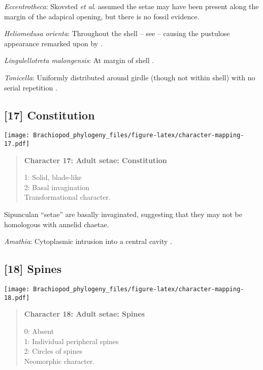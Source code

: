 \documentclass[openany]{book}
\theoremstyle{definition}
\theoremstyle{definition}
\theoremstyle{definition}
\theoremstyle{remark}
\begin{document}
\hypertarget{Eccentrotheca-coding-16}{}
\emph{Eccentrotheca}: Skovsted \emph{et al}.
\citeyearpar{Skovsted2011Scleritomeconstruction} assumed the setae may
have been present along the margin of the adapical opening, but there is
no fossil evidence.

\hypertarget{Heliomedusa_orienta-coding-16}{}
\emph{Heliomedusa orienta}: Throughout the shell -- see
\citet{Williams2007Supplement} -- causing the pustulose appearance
remarked upon by \citet{Chen2007Reinterpretationof}.

\hypertarget{Lingulellotreta_malongensis-coding-16}{}
\emph{Lingulellotreta malongensis}: At margin of shell
\citep{Zhang2005}.

\hypertarget{Tonicella-coding-16}{}
\emph{Tonicella}: Uniformly distributed around girdle (though not within
shell) with no serial repetition \citep{Vinther2005, Leise1988}.

\subsection*{{[}17{]} Constitution}\label{constitution}

\texttt{[image: Brachiopod\_phylogeny\_files/figure-latex/character-mapping-17.pdf]}

\begin{quote}
\textbf{Character 17: Adult setae: Constitution}

1: Solid, blade-like\\
2: Basal invagination\\
Transformational character.
\end{quote}

Sipunculan ``setae'' are basally invaginated, suggesting that they may
not be homologous with annelid chaetae.

\hypertarget{Amathia-coding-17}{}
\emph{Amathia}: Cytoplasmic intrusion into a central cavity
\citep{Gordon1975}.

\subsection*{{[}18{]} Spines}\label{spines}

\texttt{[image: Brachiopod\_phylogeny\_files/figure-latex/character-mapping-18.pdf]}

\begin{quote}
\textbf{Character 18: Adult setae: Spines}

0: Absent\\
1: Individual peripheral spines\\
2: Circles of spines\\
Neomorphic character.
\end{quote}
\end{document}
